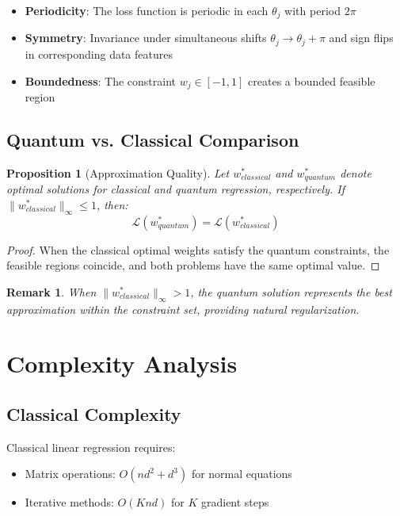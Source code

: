 \documentclass[11pt]{article}
\newtheorem{proposition}[theorem]{Proposition}
\newtheorem{remark}[theorem]{Remark}
\begin{document}
\begin{itemize}
\item \textbf{Periodicity}: The loss function is periodic in each $\theta_j$ with period $2\pi$
\item \textbf{Symmetry}: Invariance under simultaneous shifts $\theta_j \to \theta_j + \pi$ and sign flips in corresponding data features
\item \textbf{Boundedness}: The constraint $w_j \in [-1, 1]$ creates a bounded feasible region
\end{itemize}

\subsection{Quantum vs. Classical Comparison}

\begin{proposition}[Approximation Quality]
Let $w^*_{classical}$ and $w^*_{quantum}$ denote optimal solutions for classical and quantum regression, respectively. If $\|w^*_{classical}\|_\infty \leq 1$, then:
\begin{equation}
\mathcal{L}(w^*_{quantum}) = \mathcal{L}(w^*_{classical})
\end{equation}
\end{proposition}

\begin{proof}
When the classical optimal weights satisfy the quantum constraints, the feasible regions coincide, and both problems have the same optimal value.
\end{proof}

\begin{remark}
When $\|w^*_{classical}\|_\infty > 1$, the quantum solution represents the best approximation within the constraint set, providing natural regularization.
\end{remark}

\section{Complexity Analysis}

\subsection{Classical Complexity}

Classical linear regression requires:
\begin{itemize}
\item Matrix operations: $O(nd^2 + d^3)$ for normal equations
\item Iterative methods: $O(Knd)$ for $K$ gradient steps
\end{itemize}
\end{document}
